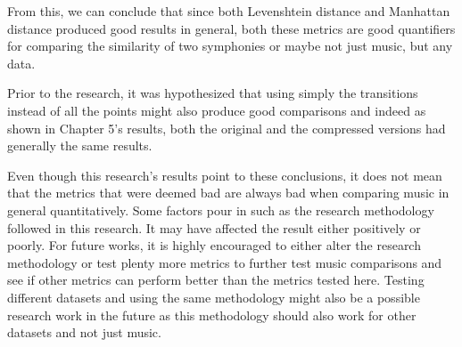 From this, we can conclude that since both Levenshtein distance and Manhattan distance produced good results in general, both these metrics are good quantifiers for comparing the similarity of two symphonies or maybe not just music, but any data.

Prior to the research, it was hypothesized that using simply the transitions instead of all the points might also produce good comparisons and indeed as shown in Chapter 5's results, both the original and the compressed versions had generally the same results.

Even though this research’s results point to these conclusions, it does not mean that the metrics that were deemed bad are always bad when comparing music in general quantitatively. Some  factors pour in such as the research methodology followed in this research. It may have affected the result either positively or poorly. For future works, it is highly encouraged to either alter the research methodology or test plenty more metrics to further test music comparisons and see if other metrics can perform better than the metrics tested here. Testing different datasets and using the same methodology might also be a possible research work in the future as this methodology should also work for other datasets and not just music.

\nocite{*}